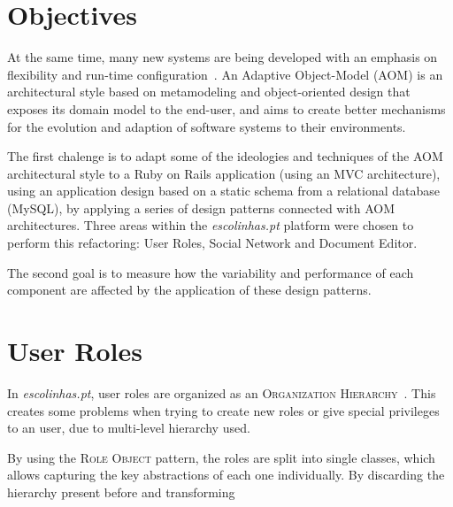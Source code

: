 \documentclass[9pt,a4paper]{extarticle}
\begin{document}
\begin{multicols}{2}
\section{Objectives}\label{sec:objectives}

At the same time, many new systems are being developed with an emphasis on flexibility and run-time configuration~\cite{YJ02}. An Adaptive Object-Model (AOM) is an architectural style based on metamodeling and object-oriented design that exposes its domain model to the end-user, and aims to create better mechanisms for the evolution and adaption of software systems to their environments.

The first chalenge is to adapt some of the ideologies and techniques of the AOM architectural style to a Ruby on Rails application (using an MVC architecture), using an application design based on a static schema from a relational database (MySQL), by applying a series of design patterns connected with AOM architectures. Three areas within the \emph{escolinhas.pt} platform were chosen to perform this refactoring: User Roles, Social Network and Document Editor.

The second goal is to measure how the variability and performance of each component are affected by the application of these design patterns.

\section{User Roles}\label{sec:user_roles}

In \emph{escolinhas.pt}, user roles are organized as an \textsc{Organization Hierarchy}~\cite{fowler_accountability}. This creates some problems when trying to create new roles or give special privileges to an user, due to multi-level hierarchy used.


By using the \textsc{Role Object} pattern, the roles are split into single classes, which allows capturing the key abstractions of each one individually. By discarding the hierarchy present before and transforming



\end{multicols}
\end{document}
